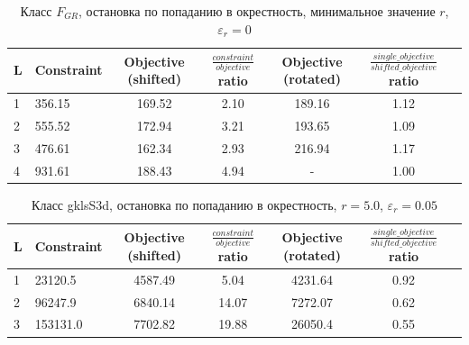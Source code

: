 \documentclass[a4paper]{article}
\begin{document}
\begin{table}[H]
\begin{center}
\caption{Класс $F_{GR}$, остановка по попаданию в окрестность, минимальное значение $r$, $\varepsilon_r=0$}
  \begin{tabular}{l|l*{5}{c}}
  L & Constraint & Objective (shifted) & $\frac{constraint}{objective}$ ratio & Objective (rotated) & $\frac{single\_objective}{shifted\_objective}$ ratio \\
  \hline
  1 & 356.15 & 169.52 & 2.10 & 189.16 & 1.12 \\
  2 & 555.52 & 172.94 & 3.21 & 193.65 & 1.09 \\
  3 & 476.61 & 162.34 & 2.93 & 216.94 & 1.17 \\
  4 & 931.61 & 188.43 & 4.94 &  -     & 1.00 \\
  \end{tabular}
\end{center}
\end{table}

\begin{table}[H]
\begin{center}
\caption{Класс gklsS3d, остановка по попаданию в окрестность, $r=5.0$, $\varepsilon_r=0.05$}
  \begin{tabular}{l|l*{5}{c}}
  L & Constraint & Objective (shifted) & $\frac{constraint}{objective}$ ratio & Objective (rotated) & $\frac{single\_objective}{shifted\_objective}$ ratio \\
  \hline
  1 & 23120.5  & 4587.49 &  5.04 & 4231.64 & 0.92 \\
  2 & 96247.9  & 6840.14 & 14.07 & 7272.07 & 0.62 \\
  3 & 153131.0 & 7702.82 & 19.88 & 26050.4 & 0.55 \\
  \end{tabular}
\end{center}
\end{table}
\end{document}
